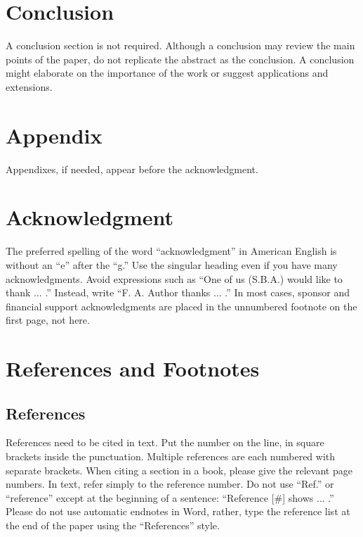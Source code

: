 \documentclass[journal]{IEEEtranTICPS}
\begin{document}
\section{Conclusion}

A conclusion section is not required. Although a conclusion may review the main points of the paper, do not replicate the abstract as the conclusion. A conclusion might elaborate on the importance of the work or suggest applications and extensions.


\section*{Appendix}

Appendixes, if needed, appear before the acknowledgment.

\section*{Acknowledgment}

The preferred spelling of the word ``acknowledgment'' in American English is without an ``e'' after the ``g.'' Use the singular heading even if you have many acknowledgments. Avoid expressions such as ``One of us (S.B.A.) would like to thank ... .'' Instead, write ``F. A. Author thanks ... .'' In most cases, sponsor and financial support acknowledgments are placed in the unnumbered footnote on the first page, not here.

\section*{References and Footnotes}

\subsection{References}
References need to be cited in text. Put the number on the line, in square brackets inside the punctuation.  Multiple references are each numbered with separate brackets. When citing a section in a book, please give the relevant page numbers. In text, refer simply to the reference number. Do not use ``Ref.'' or ``reference'' except at the beginning of a sentence: ``Reference [\#] shows ... .'' Please do not use automatic endnotes in Word, rather, type the reference list at the end of the paper using the ``References'' style.
\end{document}
